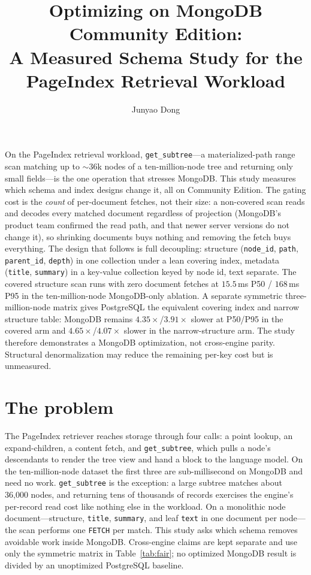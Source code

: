\documentclass[11pt]{article}
\title{\textbf{Optimizing \code{get\_subtree} on MongoDB Community Edition:\\
A Measured Schema Study for the PageIndex Retrieval Workload}}
\author{Junyao Dong}
\date{}
\newcommand{\code}[1]{\texttt{#1}}
\renewenvironment{abstract}{%
  \par\medskip\noindent{\bfseries\abstractname.}\enspace\ignorespaces
}{\par\medskip}
\begin{document}
\maketitle

\begin{abstract}
On the PageIndex retrieval workload, \code{get\_subtree}---a materialized-path
range scan matching up to ${\sim}36$k nodes of a ten-million-node tree and
returning only small fields---is the one operation that stresses MongoDB. This
study measures which schema and index designs change it, all on Community
Edition. The gating cost is the \emph{count} of per-document fetches, not their
size: a non-covered scan reads and decodes every matched document regardless of
projection (MongoDB's product team confirmed the read path, and that newer
server versions do not change it), so shrinking documents buys nothing and
removing the fetch buys everything. The design that follows is full decoupling:
structure (\code{node\_id}, \code{path}, \code{parent\_id}, \code{depth}) in one
collection under a lean covering index, metadata (\code{title}, \code{summary})
in a key-value collection keyed by node id, text separate. The covered structure
scan runs with zero document fetches at $15.5$\,ms P50 / $168$\,ms P95 in the
ten-million-node MongoDB-only ablation. A separate symmetric three-million-node
matrix gives PostgreSQL the equivalent covering index and narrow structure
table: MongoDB remains $4.35{\times}$/$3.91{\times}$ slower at P50/P95 in the
covered arm and $4.65{\times}$/$4.07{\times}$ slower in the narrow-structure
arm. The study therefore demonstrates a MongoDB optimization, not cross-engine
parity. Structural denormalization may reduce the remaining per-key cost but is
unmeasured.
\end{abstract}

\section{The problem}

The PageIndex retriever reaches storage through four calls: a point lookup, an
expand-children, a content fetch, and \code{get\_subtree}, which pulls a node's
descendants to render the tree view and hand a block to the language model. On
the ten-million-node dataset the first three are sub-millisecond on MongoDB and
need no work. \code{get\_subtree} is the exception: a large subtree matches
about 36{,}000 nodes, and returning tens of thousands of records exercises the
engine's per-record read cost like nothing else in the workload. On a monolithic
node document---structure, \code{title}, \code{summary}, and leaf \code{text} in
one document per node---the scan performs one \code{FETCH} per match. This study
asks which schema removes avoidable work inside MongoDB. Cross-engine claims are
kept separate and use only the symmetric matrix in Table~\ref{tab:fair}; no
optimized MongoDB result is divided by an unoptimized PostgreSQL baseline.
\end{document}

